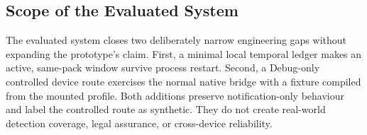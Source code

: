 \subsection{Scope of the Evaluated System}

The evaluated system closes two deliberately narrow engineering gaps without expanding the prototype's claim. First, a minimal local temporal ledger makes an active, same-pack window survive process restart. Second, a Debug-only controlled device route exercises the normal native bridge with a fixture compiled from the mounted profile. Both additions preserve notification-only behaviour and label the controlled route as synthetic. They do not create real-world detection coverage, legal assurance, or cross-device reliability.
